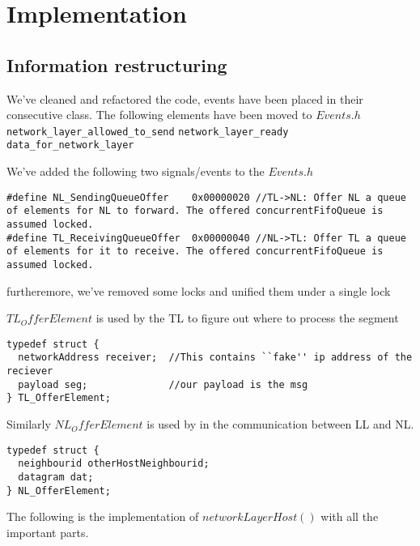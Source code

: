 \section{Implementation}
\subsection{Information restructuring}

We've cleaned and refactored the code, events have been placed in their consecutive class.
The following elements have been moved to $Events.h$
\\
\texttt{network\_layer\_allowed\_to\_send}
\break
\texttt{network\_layer\_ready}
\break
\texttt{data\_for\_network\_layer}
\break

We've added the following two signals/events to the $Events.h$

\begin{lstlisting}
#define NL_SendingQueueOffer    0x00000020 //TL->NL: Offer NL a queue of elements for NL to forward. The offered concurrentFifoQueue is assumed locked.
#define TL_ReceivingQueueOffer  0x00000040 //NL->TL: Offer TL a queue of elements for it to receive. The offered concurrentFifoQueue is assumed locked.
\end{lstlisting}

furtheremore, we've removed some locks and unified them under a single lock



$TL_OfferElement$ is used by the TL to figure out where to process the segment

\begin{lstlisting}
typedef struct {
  networkAddress receiver;  //This contains ``fake'' ip address of the reciever
  payload seg;              //our payload is the msg
} TL_OfferElement;
\end{lstlisting}

Similarly $NL_OfferElement$ is used by in the communication between LL and NL.
\begin{lstlisting}
typedef struct {
  neighbourid otherHostNeighbourid;
  datagram dat;
} NL_OfferElement;
\end{lstlisting}

The following is the implementation of $networkLayerHost()$ with all the important parts.

